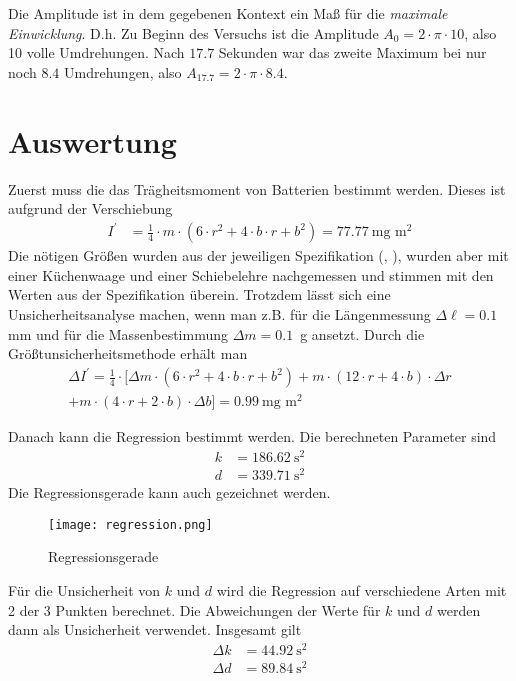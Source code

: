 \documentclass{article}
\begin{document}
Die Amplitude ist in dem gegebenen Kontext ein Maß für die \textit{maximale Einwicklung}. D.h. Zu Beginn des Versuchs ist die Amplitude $A_0 = 2\cdot \pi \cdot 10$, also 10 volle Umdrehungen. Nach $17.7$ Sekunden war das zweite Maximum bei nur noch $8.4$ Umdrehungen, also $A_{17.7} = 2\cdot \pi \cdot 8.4$.





\newpage
\section{Auswertung}

Zuerst muss die das Trägheitsmoment von Batterien bestimmt werden. Dieses ist aufgrund der Verschiebung
\begin{align}
I^\prime &= \frac{1}{4} \cdot m \cdot \left( 6\cdot r^2 + 4\cdot b \cdot r + b^2\right) = 77.77~\text{mg m}^2
\end{align}
Die nötigen Größen wurden aus der jeweiligen Spezifikation (\cite{apple}, \cite{duracell}), wurden aber mit einer Küchenwaage und einer Schiebelehre nachgemessen und stimmen mit den Werten aus der Spezifikation überein. Trotzdem lässt sich eine Unsicherheitsanalyse machen, wenn man z.B. für die Längenmessung $\Delta \ell = 0.1~$mm und für die Massenbestimmung $\Delta m = 0.1$~g ansetzt. Durch die Größtunsicherheitsmethode erhält man
\begin{align}
\Delta I^\prime = \frac{1}{4}\cdot \bigg[\Delta m \cdot \left( 6\cdot r^2 + 4\cdot b \cdot r + b^2\right) + m \cdot \left( 12\cdot r + 4\cdot b \right)\cdot \Delta r \\ 
+ m \cdot \left(  4 \cdot r + 2\cdot b\right)\cdot \Delta b\bigg] = 0.99~\text{mg m}^2
\end{align}

Danach kann die Regression bestimmt werden. Die berechneten Parameter sind
\begin{align}
k &= 186.62~\text{s}^2 \\
d &= 339.71~\text{s}^2
\end{align}
Die Regressionsgerade kann auch gezeichnet werden.

\begin{figure}[H]
\centering
\texttt{[image: regression.png]}
\caption{Regressionsgerade}
\end{figure}

Für die Unsicherheit von $k$ und $d$ wird die Regression auf verschiedene Arten mit 2 der 3 Punkten berechnet. Die Abweichungen der Werte für $k$ und $d$ werden dann als Unsicherheit verwendet. Insgesamt gilt
\begin{align}
\Delta k &= 44.92~\text{s}^2\\
\Delta d &= 89.84~\text{s}^2
\end{align}
\end{document}
